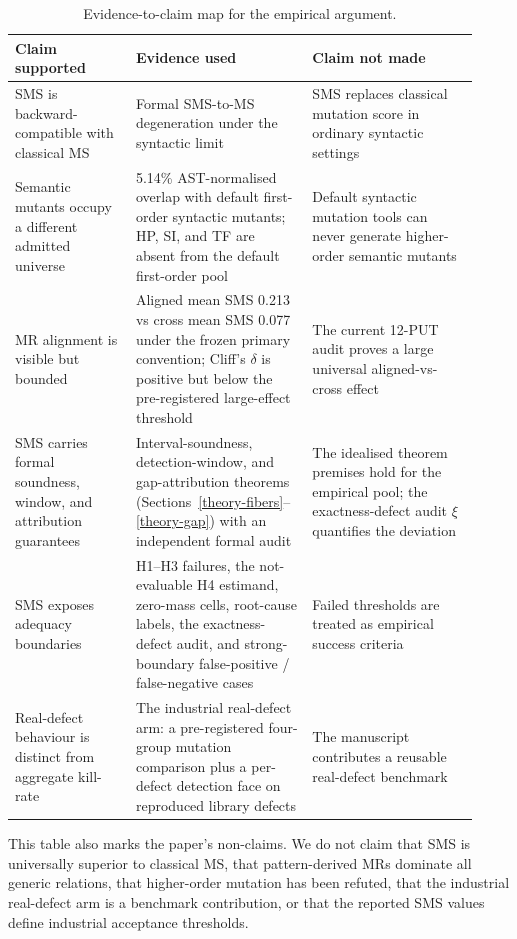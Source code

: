 \documentclass[manuscript,screen,review]{acmart}
\begin{document}
\begin{table}[t]
\caption{Evidence-to-claim map for the empirical argument.}
\label{tab:claim-evidence-map}
\centering
\small
\begin{tabular}{p{0.24\linewidth}p{0.35\linewidth}p{0.33\linewidth}}
\toprule
Claim supported & Evidence used & Claim not made \\
\midrule
SMS is backward-compatible with classical MS & Formal SMS-to-MS
degeneration under the syntactic limit & SMS replaces classical mutation
score in ordinary syntactic settings \\
Semantic mutants occupy a different admitted universe & 5.14\%
AST-normalised overlap with default first-order syntactic mutants;
HP, SI, and TF are absent from the default first-order pool & Default
syntactic mutation tools can never generate higher-order semantic
mutants \\
MR alignment is visible but bounded & Aligned mean SMS 0.213 vs
cross mean SMS 0.077 under the frozen primary convention; Cliff's
\(\delta\) is positive but below the
pre-registered large-effect threshold & The current 12-PUT audit proves
a large universal aligned-vs-cross effect \\
SMS carries formal soundness, window, and attribution guarantees &
Interval-soundness, detection-window, and gap-attribution theorems
(Sections~\ref{theory-fibers}--\ref{theory-gap}) with an independent
formal audit & The idealised theorem premises hold for the empirical
pool; the exactness-defect audit \(\xi\) quantifies the deviation \\
SMS exposes adequacy boundaries & H1--H3 failures, the not-evaluable H4
estimand, zero-mass cells,
root-cause labels, the exactness-defect audit, and strong-boundary
false-positive / false-negative
cases & Failed thresholds are treated as empirical success criteria \\
Real-defect behaviour is distinct from aggregate kill-rate & The
industrial real-defect arm: a pre-registered four-group mutation
comparison plus a per-defect detection face on reproduced library
defects & The manuscript contributes a reusable
real-defect benchmark \\
\bottomrule
\end{tabular}
\normalsize
\end{table}

This table also marks the paper's non-claims. We do not claim that SMS
is universally superior to classical MS, that pattern-derived MRs
dominate all generic relations, that higher-order mutation has been
refuted, that the industrial real-defect arm is a benchmark contribution, or that
the reported SMS values define industrial acceptance thresholds.
\end{document}
